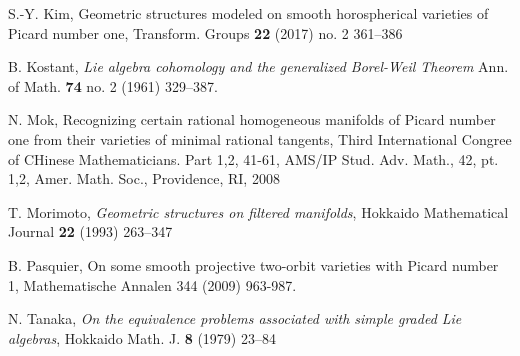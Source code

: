 \documentclass[12pt]{amsart}
\theoremstyle{plain}
\theoremstyle{definition}
\begin{document}
\begin{thebibliography}{}
S.-Y. Kim, Geometric structures modeled on smooth horospherical varieties of Picard number one, Transform. Groups {\bf 22} (2017) no. 2 361--386


 B. Kostant, \emph{Lie algebra cohomology and the generalized Borel-Weil Theorem} Ann. of Math. {\bf 74} no. 2 (1961) 329--387.

 N. Mok, Recognizing certain rational homogeneous manifolds of Picard number one from their varieties of minimal rational tangents,  Third International Congree of CHinese Mathematicians. Part 1,2, 41-61, AMS/IP Stud. Adv. Math., 42, pt. 1,2, Amer. Math. Soc., Providence, RI, 2008

 T. Morimoto, \emph{Geometric structures on filtered manifolds}, Hokkaido Mathematical Journal {\bf 22} (1993) 263--347

 B. Pasquier, On some smooth projective two-orbit varieties with Picard number 1, Mathematische Annalen 344 (2009) 963-987.

 N. Tanaka, \emph{On the equivalence problems associated with simple graded Lie algebras}, Hokkaido Math. J. {\bf 8} (1979) 23--84
\end{thebibliography}
\end{document}
